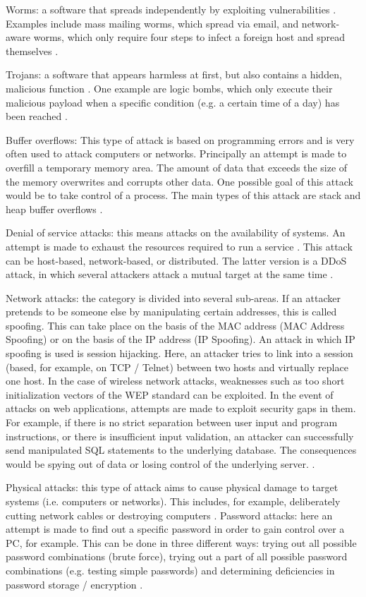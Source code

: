 \documentclass[conference]{IEEEtran}
\begin{document}
\smallskip Worms: a software that spreads independently by exploiting vulnerabilities \cite{b6}. Examples include mass mailing worms, which spread via email, and network-aware worms, which only require four steps to infect a foreign host and spread themselves \cite{b2}.

\smallskip Trojans: a software that appears harmless at first, but also contains a hidden, malicious function \cite{b6}. One example are logic bombs, which only execute their malicious payload when a specific condition (e.g. a certain time of a day) has been reached \cite{b2}.

\smallskip Buffer overflows: This type of attack is based on programming errors and is very often used to attack computers or networks. Principally an attempt is made to overfill a temporary memory area. The amount of data that exceeds the size of the memory overwrites and corrupts other data. One possible goal of this attack would be to take control of a process. The main types of this attack are stack and heap buffer overflows \cite{b2}.

\smallskip Denial of service attacks: this means attacks on the availability of systems.  An attempt is made to exhaust the resources required to run a service \cite{b6}. This attack can be host-based, network-based, or distributed. The latter version is a DDoS attack, in which several attackers attack a mutual target at the same time \cite{b2}.

\smallskip Network attacks: the category is divided into several sub-areas. If an attacker pretends to be someone else by manipulating certain addresses, this is called spoofing. This can take place on the basis of the MAC address (MAC Address Spoofing) or on the basis of the IP address (IP Spoofing). An attack in which IP spoofing is used is session hijacking. Here, an attacker tries to link into a session (based, for example, on TCP / Telnet) between two hosts and virtually replace one host. In the case of wireless network attacks, weaknesses such as too short initialization vectors of the WEP standard can be exploited. In the event of attacks on web applications, attempts are made to exploit security gaps in them.  For example, if there is no strict separation between user input and program instructions, or there is insufficient input validation, an attacker can successfully send manipulated SQL statements to the underlying database. The consequences would be spying out of data or losing control of the underlying server. \cite{b2}.

\smallskip Physical attacks: this type of attack aims to cause physical damage to target systems (i.e. computers or networks). This includes, for example, deliberately cutting network cables or destroying computers \cite{b2}.
Password attacks: here an attempt is made to find out a specific password in order to gain control over a PC, for example. This can be done in three different ways: trying out all possible password combinations (brute force), trying out a part of all possible password combinations (e.g. testing simple passwords) and determining deficiencies in password storage / encryption \cite{b2,b5}.
\end{document}
